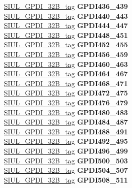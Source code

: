 \begin{DoxyCompactItemize}
\begin{tabbing}
\>\>\mbox{\hyperlink{unionSIUL__GPDI__32B__tag}{SIUL\_GPDI\_32B\_tag}} {\bfseries GPDI436\_439}\\
\>\>\mbox{\hyperlink{unionSIUL__GPDI__32B__tag}{SIUL\_GPDI\_32B\_tag}} {\bfseries GPDI440\_443}\\
\>\>\mbox{\hyperlink{unionSIUL__GPDI__32B__tag}{SIUL\_GPDI\_32B\_tag}} {\bfseries GPDI444\_447}\\
\>\>\mbox{\hyperlink{unionSIUL__GPDI__32B__tag}{SIUL\_GPDI\_32B\_tag}} {\bfseries GPDI448\_451}\\
\>\>\mbox{\hyperlink{unionSIUL__GPDI__32B__tag}{SIUL\_GPDI\_32B\_tag}} {\bfseries GPDI452\_455}\\
\>\>\mbox{\hyperlink{unionSIUL__GPDI__32B__tag}{SIUL\_GPDI\_32B\_tag}} {\bfseries GPDI456\_459}\\
\>\>\mbox{\hyperlink{unionSIUL__GPDI__32B__tag}{SIUL\_GPDI\_32B\_tag}} {\bfseries GPDI460\_463}\\
\>\>\mbox{\hyperlink{unionSIUL__GPDI__32B__tag}{SIUL\_GPDI\_32B\_tag}} {\bfseries GPDI464\_467}\\
\>\>\mbox{\hyperlink{unionSIUL__GPDI__32B__tag}{SIUL\_GPDI\_32B\_tag}} {\bfseries GPDI468\_471}\\
\>\>\mbox{\hyperlink{unionSIUL__GPDI__32B__tag}{SIUL\_GPDI\_32B\_tag}} {\bfseries GPDI472\_475}\\
\>\>\mbox{\hyperlink{unionSIUL__GPDI__32B__tag}{SIUL\_GPDI\_32B\_tag}} {\bfseries GPDI476\_479}\\
\>\>\mbox{\hyperlink{unionSIUL__GPDI__32B__tag}{SIUL\_GPDI\_32B\_tag}} {\bfseries GPDI480\_483}\\
\>\>\mbox{\hyperlink{unionSIUL__GPDI__32B__tag}{SIUL\_GPDI\_32B\_tag}} {\bfseries GPDI484\_487}\\
\>\>\mbox{\hyperlink{unionSIUL__GPDI__32B__tag}{SIUL\_GPDI\_32B\_tag}} {\bfseries GPDI488\_491}\\
\>\>\mbox{\hyperlink{unionSIUL__GPDI__32B__tag}{SIUL\_GPDI\_32B\_tag}} {\bfseries GPDI492\_495}\\
\>\>\mbox{\hyperlink{unionSIUL__GPDI__32B__tag}{SIUL\_GPDI\_32B\_tag}} {\bfseries GPDI496\_499}\\
\>\>\mbox{\hyperlink{unionSIUL__GPDI__32B__tag}{SIUL\_GPDI\_32B\_tag}} {\bfseries GPDI500\_503}\\
\>\>\mbox{\hyperlink{unionSIUL__GPDI__32B__tag}{SIUL\_GPDI\_32B\_tag}} {\bfseries GPDI504\_507}\\
\>\>\mbox{\hyperlink{unionSIUL__GPDI__32B__tag}{SIUL\_GPDI\_32B\_tag}} {\bfseries GPDI508\_511}\\

\end{tabbing}
\end{DoxyCompactItemize}
